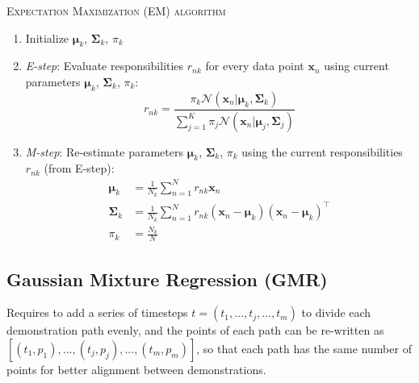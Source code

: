 \documentclass{article}
\begin{document}
\begin{algorithm}[htbp]
\caption{\textsc{Expectation Maximization (EM) algorithm}}
\label{algo:EM}
\DontPrintSemicolon
{}


\begin{enumerate}
  \item Initialize $\bm{\mu}_{k}$, $\bm{\Sigma}_{k}$, $\pi_{k}$
  \item \emph{E-step}: Evaluate responsibilities $r_{nk}$ for every data point $\bm{x}_{n}$ using current parameters $\bm{\mu}_{k}$, $\bm{\Sigma}_{k}$, $\pi_{k}$:
        \begin{equation}
          r_{nk} = \frac{\pi_{k}  \mathcal{N}(\bm{x}_{n}|\bm{\mu}_{k}, \bm{\Sigma}_{k})}{\sum^{K}_{j=1} \pi_{j}  \mathcal{N}(\bm{x}_{n}|\bm{\mu}_{j}, \bm{\Sigma}_{j})}
        \end{equation}
  \item \emph{M-step}: Re-estimate parameters $\bm{\mu}_{k}$, $\bm{\Sigma}_{k}$, $\pi_{k}$ using the current responsibilities $r_{nk}$ (from E-step):
        \begin{align}
          \bm{\mu}_{k} &= \frac{1}{N_{k}} \sum_{n=1}^{N}r_{nk}\bm{x}_{n}\\
          \bm{\Sigma}_{k} &= \frac{1}{N_{k}} \sum^{N}_{n=1} r_{nk} (\bm{x}_{n} - \bm{\mu}_{k})(\bm{x}_{n} - \bm{\mu}_{k})^{\top}\\
          \pi_{k} &= \frac{N_{k}}{N}
        \end{align}
\end{enumerate}
\end{algorithm}

\subsection{Gaussian Mixture Regression (GMR)}
Requires to add a series of timesteps $t = (t_{1}, \dots, t_{j}, \dots, t_{m})$ to divide each demonstration path evenly, and the points of each path can be re-written as $[(t_1, p_1), ..., (t_j, p_j), ..., (t_m, p_m)]$, so that each path has the same number of points for better alignment between demonstrations.
\end{document}
